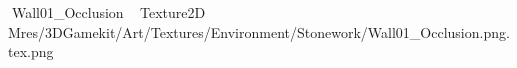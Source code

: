    Wall01_Occlusion             	   Texture2D
   M   res/3DGamekit/Art/Textures/Environment/Stonework/Wall01_Occlusion.png.tex.png